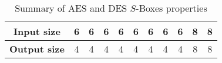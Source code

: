 \documentclass{report}
\begin{document}
\begin{table}[H]
{\begin{tabular}{|c|c|c|c|c|c|c|c|c|c|c|}
\textbf{Input size}              & 6                                                            & 6                                                            & 6                                                            & 6                                                            & 6                                                            & 6                                                            & 6                                                            & 6                                                            & 8                                                          & 8                                                              \\ \hline
\textbf{Output size}             & 4                                                            & 4                                                            & 4                                                            & 4                                                            & 4                                                            & 4                                                            & 4                                                            & 4                                                            & 8                                                          & 8                                                              \\ \hline
\end{tabular}%
}
\caption{Summary of AES and DES $S$-Boxes properties}
\label{tbl:summary}
\end{table}



\end{document}
